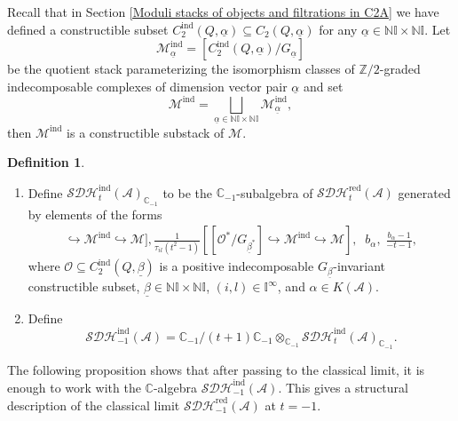 \documentclass[12pt]{amsart}
\theoremstyle{definition}
\newtheorem{definition}[theorem]{Definition}
\numberwithin{equation}{section}
\begin{document}
Recall that in Section \ref{Moduli stacks of objects and filtrations in C2A} we have defined a constructible subset $ C_2^{\mathrm{ind}}(Q,\underline{\alpha}) \subseteq C_2(Q,\underline{\alpha})  $ for any $\underline{\alpha} \in \mathbb{N}\mathbb{I} \times \mathbb{N}\mathbb{I} $. 
Let
\[\mathcal{M}^{\mathrm{ind}}_{\underline{\alpha}} = [C_2^{\mathrm{ind}}(Q,\underline{\alpha})/G_{\underline{\alpha}}] 
\]
be the quotient stack parameterizing the isomorphism classes of $\mathbb{Z}/2 $-graded indecomposable complexes of dimension vector pair $ \underline{\alpha} $ and set
\[
\mathcal{M}^{\mathrm{ind}} = \bigsqcup_{\underline{\alpha} \in \mathbb{N}\mathbb{I} \times \mathbb{N}\mathbb{I} } \mathcal{M}^{\mathrm{ind}}_{\underline{\alpha}},
\]
then $ \mathcal{M}^{\mathrm{ind}} $ is a constructible substack of $ \mathcal{M} $. 

\begin{definition}\;
    \label{Definition of SDHind-1}
    \begin{enumerate}
        \item Define $ \mathcal{SDH}_t^{\mathrm{ind}}(\mathcal{A})_{\mathbb{C}_{-1}} $ to be the $ \mathbb{C}_{-1} $-subalgebra of $ \mathcal{SDH}_t^{\mathrm{red}}(\mathcal{A}) $ generated by elements of the forms
    \begin{align*}
    [[\mathcal{O}/G_{\underline{\beta}}]\hookrightarrow \mathcal{M}^{\mathrm{ind}}\hookrightarrow \mathcal{M}],\frac{1}{\tau_{il}(t^2-1)}[[\mathcal{O}^*/G_{\underline{\beta}^*}] \hookrightarrow \mathcal{M}^{\mathrm{ind}}\hookrightarrow \mathcal{M}],\;\;b_{\alpha},\;\frac{b_{\alpha}-1}{-t-1},
    \end{align*}
    where $ \mathcal{O} \subseteq C_2^{\mathrm{ind}}(Q, \underline{\beta}) $ is a positive indecomposable $ G_{\underline{\beta}} $-invariant constructible subset, $\underline{\beta} \in \mathbb{N}\mathbb{I} \times \mathbb{N}\mathbb{I} $, $ (i,l) \in \mathbb{I}^{\infty} $, and $\alpha \in K(\mathcal{A}) $. 

    \item Define
    \[\mathcal{SDH}_{-1}^{\mathrm{ind}}(\mathcal{A}) = \mathbb{C}_{-1}/(t+1)\mathbb{C}_{-1} \otimes_{\mathbb{C}_{-1}} \mathcal{SDH}_t^{\mathrm{ind}}(\mathcal{A})_{\mathbb{C}_{-1}}.\]      
    
    \end{enumerate}
        
\end{definition}

The following proposition shows that after passing to the classical limit, it is enough to work with the $ \mathbb{C} $-algebra $ \mathcal{SDH}_{-1}^{\mathrm{ind}}(\mathcal A)$. 
This gives a structural description of the classical limit $ \mathcal{SDH}_{-1}^{\mathrm{red}}(\mathcal A)$ at $ t=-1 $. 
\end{document}

